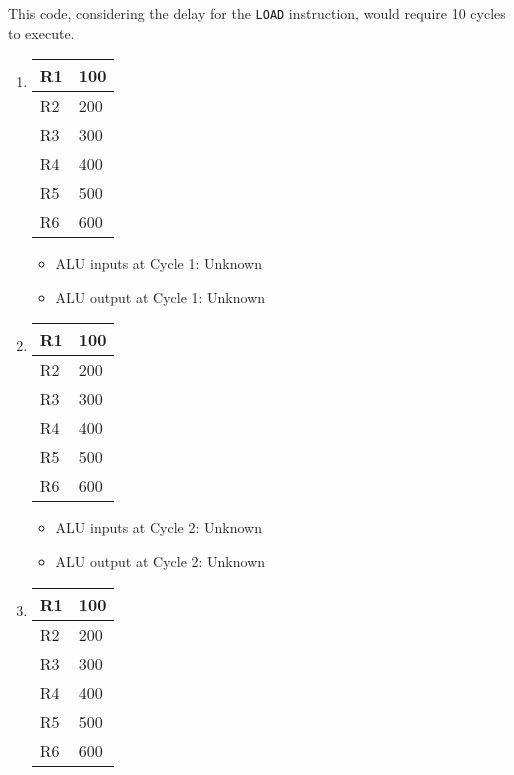 \documentclass[12pt,letterpaper]{hmcpset}
\begin{document}
\begin{solution}
This code, considering the delay for the \texttt{LOAD} instruction, would require 10 cycles to execute.
\begin{enumerate}[label=Cycle \arabic*]
\item 

\begin{tabular}{|l|l|}
\hline
R1 & 100 \\
\hline 
R2 & 200 \\
\hline
R3 & 300 \\
\hline
R4 & 400 \\
\hline
R5 & 500 \\
\hline
R6 & 600 \\
\hline
\end{tabular}

\begin{itemize}
\item ALU inputs at Cycle 1: Unknown
\item ALU output at Cycle 1: Unknown
\end{itemize}

\item 

\begin{tabular}{|l|l|}
\hline
R1 & 100 \\
\hline 
R2 & 200 \\
\hline
R3 & 300 \\
\hline
R4 & 400 \\
\hline
R5 & 500 \\
\hline
R6 & 600 \\
\hline
\end{tabular}

\begin{itemize}
\item ALU inputs at Cycle 2: Unknown
\item ALU output at Cycle 2: Unknown
\end{itemize}

\item 

\begin{tabular}{|l|l|}
\hline
R1 & 100 \\
\hline 
R2 & 200 \\
\hline
R3 & 300 \\
\hline
R4 & 400 \\
\hline
R5 & 500 \\
\hline
R6 & 600 \\
\hline
\end{tabular}


\end{enumerate}
\end{solution}
\end{document}
